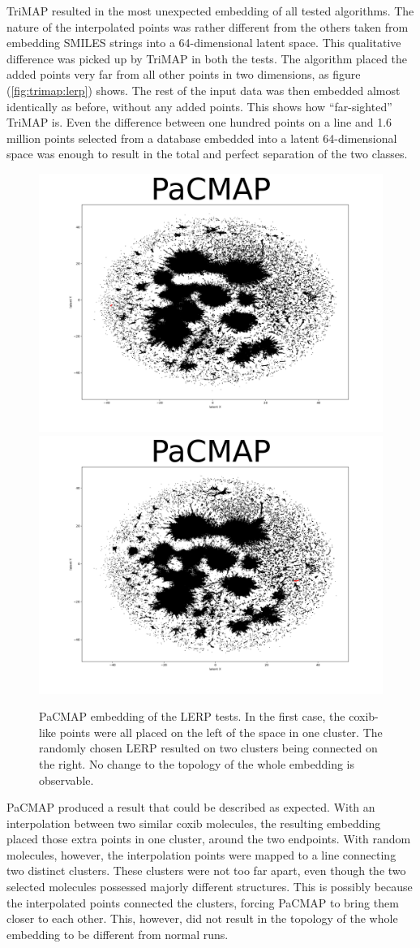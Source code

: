TriMAP resulted in the most unexpected embedding of all tested algorithms. The nature of the interpolated points was rather different from the others taken from embedding SMILES strings into a 64-dimensional latent space. This qualitative difference was picked up by TriMAP in both the tests. The algorithm placed the added points very far from all other points in two dimensions, as figure (\ref{fig:trimap:lerp}) shows. The rest of the input data was then embedded almost identically as before, without any added points. This shows how ``far-sighted'' TriMAP is. Even the difference between one hundred points on a line and 1.6 million points selected from a database embedded into a latent 64-dimensional space was enough to result in the total and perfect separation of the two classes.

\begin{figure}[h]
	\centering
	\includegraphics[width=0.6\columnwidth]{figures/PaCMAP_LERP_coxib}
	\includegraphics[width=0.6\columnwidth]{figures/PaCMAP_LERP_random}
	\caption{PaCMAP embedding of the LERP tests. In the first case, the coxib-like points were all placed on the left of the space in one cluster. The randomly chosen LERP resulted on two clusters being connected on the right. No change to the topology of the whole embedding is observable.}
	\label{fig:pacmap:lerp}
\end{figure}

PaCMAP produced a result that could be described as expected. With an interpolation between two similar coxib molecules, the resulting embedding placed those extra points in one cluster, around the two endpoints. With random molecules, however, the interpolation points were mapped to a line connecting two distinct clusters. These clusters were not too far apart, even though the two selected molecules possessed majorly different structures. This is possibly because the interpolated points connected the clusters, forcing PaCMAP to bring them closer to each other. This, however, did not result in the topology of the whole embedding to be different from normal runs.



